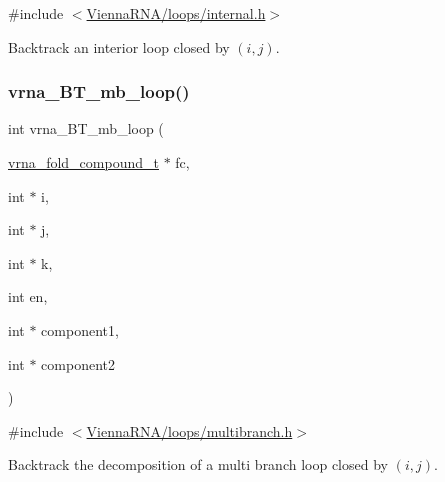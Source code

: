 {\ttfamily \#include $<$\mbox{\hyperlink{internal_8h}{Vienna\+R\+N\+A/loops/internal.\+h}}$>$}



Backtrack an interior loop closed by $ (i,j) $. 

\mbox{\label{group__mfe__backtracking_ga5b62d56c9d47c1e8792b02cd6b95e78b}} 
\subsubsection{\texorpdfstring{vrna\_BT\_mb\_loop()}{vrna\_BT\_mb\_loop()}}
{\footnotesize\ttfamily int vrna\+\_\+\+B\+T\+\_\+mb\+\_\+loop (\begin{DoxyParamCaption}\item[{\mbox{\hyperlink{group__fold__compound_ga1b0cef17fd40466cef5968eaeeff6166}{vrna\+\_\+fold\+\_\+compound\+\_\+t}} $\ast$}]{fc,  }\item[{int $\ast$}]{i,  }\item[{int $\ast$}]{j,  }\item[{int $\ast$}]{k,  }\item[{int}]{en,  }\item[{int $\ast$}]{component1,  }\item[{int $\ast$}]{component2 }\end{DoxyParamCaption})}



{\ttfamily \#include $<$\mbox{\hyperlink{multibranch_8h}{Vienna\+R\+N\+A/loops/multibranch.\+h}}$>$}



Backtrack the decomposition of a multi branch loop closed by $ (i,j) $. 


